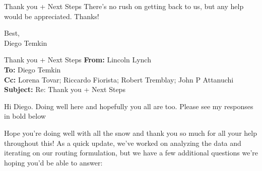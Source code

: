 {\begin{emailbox}{Thank you + Next Steps}
    There's no rush on getting back to us, but any help would be appreciated. Thanks! \vspace{1em}

    Best, \\
    Diego Temkin
\end{emailbox}

\begin{emailbox}{Thank you + Next Steps}
    \textbf{From:} Lincoln Lynch \\
    \textbf{To:} Diego Temkin \\
    \textbf{Cc:} Lorena Tovar; Riccardo Fiorista; Robert Tremblay; John P Attanuchi \\
    \textbf{Subject:} Re: Thank you + Next Steps

    \vspace{1em}
    Hi Diego. Doing well here and hopefully you all are too. Please see my responses in bold below \vspace{1em}

    Hope you're doing well with all the snow and thank you so much for all your help throughout this! As a quick update, we've worked on analyzing the data and iterating on our routing formulation, but we have a few additional questions we're hoping you'd be able to answer:


\end{emailbox}}
